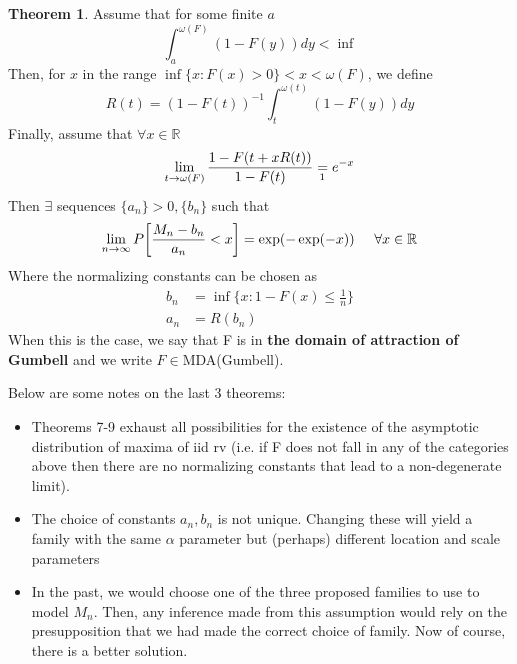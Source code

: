 \documentclass{article}
\theoremstyle{definition}
\newtheorem{theorem}{Theorem}
\theoremstyle{definition}
\def\inv{^{-1}}
\def\w{\omega}
\begin{document}
\begin{theorem}
Assume that for some finite $a$
\[\int_a^{\w(F)} (1-F(y))dy < \inf\]
Then, for $x$ in the range $\inf\{x:F(x)>0\}<x<\w(F)$, we define 
\[R(t)= (1-F(t))\inv \int_t^{\w(t)} (1-F(y))dy\]
Finally, assume that $\forall x \in \mathbb{R}$
\[\lim_{t\rightarrow \w(F)} \frac{1-F(t+xR(t))}{1-F(t)}\underset{\footnotemark}{=}e^{-x}\]
Then $\exists$ sequences $\{a_n\}>0,\{b_n\}$ such that 
\[\lim_{n\rightarrow \infty}P \bigg[ \frac{M_n-b_n}{a_n} < x\bigg]=\exp(-\exp(-x)) \hspace{0.5 cm} \forall x\in \mathbb{R}\]
Where the normalizing constants can be chosen as 
\begin{align*}
    b_n&=\inf\{x:1-F(x)\leq \frac{1}{n}\}\\
    a_n&=R(b_n)
\end{align*}
When this is the case, we say that F is in \textbf{the domain of attraction of Gumbell} and we write $F\in $MDA(Gumbell).

\end{theorem}

Below are some notes on the last 3 theorems:
\begin{itemize}
    \item Theorems 7-9 exhaust all possibilities for the existence of the asymptotic distribution of maxima of iid rv (i.e. if F does not fall in any of the categories above then there are no normalizing constants that lead to a non-degenerate limit).
    \item The choice of constants $a_n,b_n$ is not unique. Changing these will yield a family with the same $\alpha$ parameter but (perhaps) different location and scale parameters
    \item In the past, we would choose one of the three proposed families to use to model $M_n$. Then, any inference made from this assumption would rely on the presupposition that we had made the correct choice of family. Now of course, there is a better solution.
\end{itemize}
\end{document}

